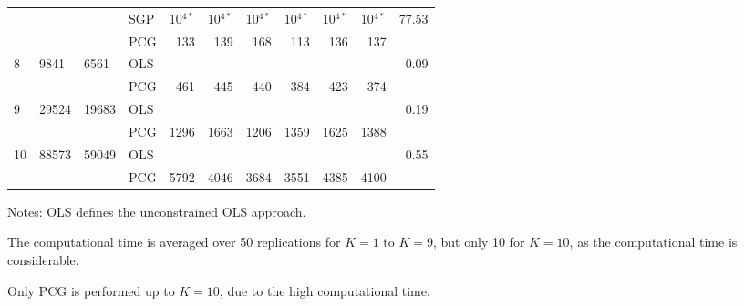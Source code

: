 \documentclass[11pt]{article}
\newcommand{\0}{\phantom{0}}
\begin{document}
\begin{table}[ht]
\begin{threeparttable}
\begin{tabular}{llllrrrrrrr}
			& & & SGP & 10$^{4*}$ & 10$^{4*}$ & 10$^{4*}$ & 10$^{4*}$ & 10$^{4*}$ & 10$^{4*}$ & 77.53 \\
			& & & PCG & 133 & 139 & 168 & 113 & 136 & 137 & \pmb{$4.48$} \\
			\midrule
			8 & 9841 & 6561 & OLS & & & & & & & 0.09 \\
			& & & PCG & 461 & 445 & 440 & 384 & 423 & 374 & \pmb{$26.25$} \\
			\midrule
			9 & 29524 & 19683 & OLS & & & & & & & 0.19 \\
			& & & PCG & 1296 & 1663 & 1206 & 1359 & 1625 & 1388 & \pmb{$227.40$} \\
			\midrule		
			10 & 88573 & 59049 & OLS & & & & & & & 0.55 \\
			& & & PCG & 5792 & 4046 & 3684 & 3551 & 4385 & 4100 & \pmb{$3274.80$}\\
			\bottomrule
		\end{tabular}
		\begin{tablenotes}
			\item [] Notes: OLS defines the unconstrained OLS approach. 
			\item [] The computational time is averaged over 50 replications for $K = 1$ to $K = 9$, but only 10 for $K = 10$, as the computational time is considerable.
			\item [] Only PCG is performed up to $K = 10$, due to the high computational time.	
		\end{tablenotes}
	\end{threeparttable}
\end{table}
\end{document}
